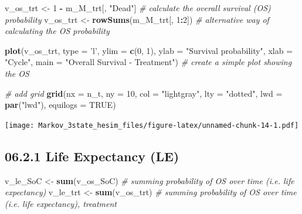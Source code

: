 \documentclass[
]{article}
\newenvironment{Shaded}{\begin{snugshade}}{\end{snugshade}}
\newcommand{\CommentTok}[1]{\textcolor[rgb]{0.56,0.35,0.01}{\textit{#1}}}
\newcommand{\DataTypeTok}[1]{\textcolor[rgb]{0.13,0.29,0.53}{#1}}
\newcommand{\DecValTok}[1]{\textcolor[rgb]{0.00,0.00,0.81}{#1}}
\newcommand{\KeywordTok}[1]{\textcolor[rgb]{0.13,0.29,0.53}{\textbf{#1}}}
\newcommand{\NormalTok}[1]{#1}
\newcommand{\OperatorTok}[1]{\textcolor[rgb]{0.81,0.36,0.00}{\textbf{#1}}}
\newcommand{\OtherTok}[1]{\textcolor[rgb]{0.56,0.35,0.01}{#1}}
\newcommand{\StringTok}[1]{\textcolor[rgb]{0.31,0.60,0.02}{#1}}
\begin{document}
\begin{Shaded}
\begin{Highlighting}[]
\NormalTok{v_os_trt <-}\StringTok{ }\DecValTok{1} \OperatorTok{-}\StringTok{ }\NormalTok{m_M_trt[, }\StringTok{"Dead"}\NormalTok{]    }\CommentTok{# calculate the overall survival (OS) probability}
\NormalTok{v_os_trt <-}\StringTok{ }\KeywordTok{rowSums}\NormalTok{(m_M_trt[, }\DecValTok{1}\OperatorTok{:}\DecValTok{2}\NormalTok{])  }\CommentTok{# alternative way of calculating the OS probability}

\KeywordTok{plot}\NormalTok{(v_os_trt, }\DataTypeTok{type =} \StringTok{'l'}\NormalTok{, }
     \DataTypeTok{ylim =} \KeywordTok{c}\NormalTok{(}\DecValTok{0}\NormalTok{, }\DecValTok{1}\NormalTok{),}
     \DataTypeTok{ylab =} \StringTok{"Survival probability"}\NormalTok{,}
     \DataTypeTok{xlab =} \StringTok{"Cycle"}\NormalTok{,}
     \DataTypeTok{main =} \StringTok{"Overall Survival - Treatment"}\NormalTok{)  }\CommentTok{# create a simple plot showing the OS}

\CommentTok{# add grid }
\KeywordTok{grid}\NormalTok{(}\DataTypeTok{nx =}\NormalTok{ n_t, }\DataTypeTok{ny =} \DecValTok{10}\NormalTok{, }\DataTypeTok{col =} \StringTok{"lightgray"}\NormalTok{, }\DataTypeTok{lty =} \StringTok{"dotted"}\NormalTok{, }\DataTypeTok{lwd =} \KeywordTok{par}\NormalTok{(}\StringTok{"lwd"}\NormalTok{), }
     \DataTypeTok{equilogs =} \OtherTok{TRUE}\NormalTok{) }
\end{Highlighting}
\end{Shaded}

\texttt{[image: Markov\_3state\_hesim\_files/figure-latex/unnamed-chunk-14-1.pdf]}

\hypertarget{life-expectancy-le}{%
\subsection{06.2.1 Life Expectancy (LE)}\label{life-expectancy-le}}

\begin{Shaded}
\begin{Highlighting}[]
\NormalTok{v_le_SoC <-}\StringTok{ }\KeywordTok{sum}\NormalTok{(v_os_SoC)  }\CommentTok{# summing probability of OS over time (i.e. life expectancy)}
\NormalTok{v_le_trt <-}\StringTok{ }\KeywordTok{sum}\NormalTok{(v_os_trt)  }\CommentTok{# summing probability of OS over time (i.e. life expectancy), treatment}
\end{Highlighting}
\end{Shaded}
\end{document}
